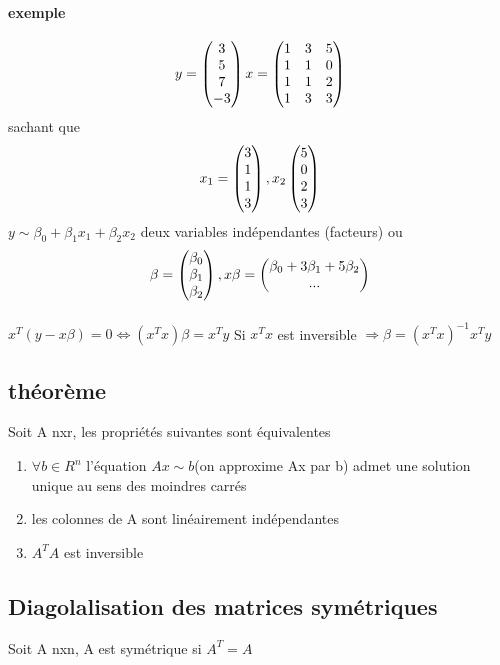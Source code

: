 \documentclass[a4paper,10pt]{article}
\begin{document}
\paragraph{exemple}
\[
y=\begin{pmatrix}
   3\cr
   5\cr
   7\cr
   -3\cr
  \end{pmatrix}
  x=\begin{pmatrix}
     1&3&5\cr
     1&1&0\cr
     1&1&2\cr
     1&3&3\cr
    \end{pmatrix}
\]
\newline
sachant que 
\[x_1=\begin{pmatrix}
       3\cr
       1\cr
       1\cr
       3\cr
      \end{pmatrix},x_2
      \begin{pmatrix}
       5\cr
       0\cr
       2\cr
       3\cr
      \end{pmatrix}
\]
\newline
$y\sim \beta_0+\beta_1x_1+\beta_2x_2$ deux variables indépendantes (facteurs)
\newline
ou 
\[
\beta=\begin{pmatrix}
       \beta_0\cr
       \beta_1\cr
       \beta_2\cr
      \end{pmatrix}
, x\beta=\begin{pmatrix}
          \beta_0+3\beta_1+5\beta_2\cr
          ...\cr
         \end{pmatrix}
\]
\paragraph{}
$x^T(y-x\beta)=0\Leftrightarrow (x^Tx)\beta=x^Ty$
\newline
Si $x^Tx$ est inversible $\Rightarrow \beta=(x^Tx)^{-1}x^Ty$
\subsection{théorème}
Soit A nxr, les propriétés suivantes sont équivalentes
\begin{enumerate}
 \item $\forall b\in R^n$ l'équation $Ax\sim b$(on approxime Ax par b) admet une solution unique au sens des moindres carrés
 \item les colonnes de A sont linéairement indépendantes
 \item $A^TA$ est inversible
\end{enumerate}
\subsection{Diagolalisation des matrices symétriques}
Soit A nxn, A est symétrique si $A^T=A$
\end{document}
